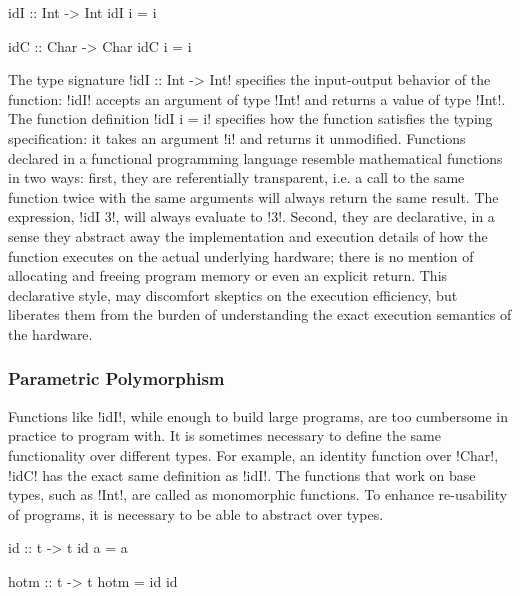 \documentclass[screen,nonacm]{acmart}
\begin{document}
\begin{minipage}{0.5\linewidth}
\begin{CenteredBox}
\begin{code}
idI :: Int -> Int
idI i = i
\end{code}
\end{CenteredBox}
\end{minipage}%
\begin{minipage}{0.5\linewidth}
\begin{CenteredBox}
\begin{code}
idC :: Char -> Char
idC i = i
\end{code}
\end{CenteredBox}
\end{minipage}

The type signature !idI :: Int -> Int! specifies the input-output behavior of the
function: !idI! accepts an argument of type !Int! and returns a value of type !Int!. The
function definition !idI i = i! specifies how the function satisfies the typing
specification: it takes an argument !i! and returns it unmodified. Functions declared in a
functional programming language resemble mathematical functions in two ways: first, they
are referentially transparent, i.e. a call to the same function twice with the same
arguments will always return the same result. The expression, !idI 3!, will always
evaluate to !3!. Second, they are declarative, in a sense they abstract away the
implementation and execution details of how the function executes on the actual underlying
hardware; there is no mention of allocating and freeing program memory or even an explicit
return. This declarative style, may discomfort skeptics on the execution efficiency, but
liberates them from the burden of understanding the exact execution semantics of the
hardware.

\subsubsection{Parametric Polymorphism}
Functions like !idI!, while enough to build large programs, are too cumbersome in
practice to program with. It is sometimes necessary to define the same functionality over
different types. For example, an identity function over !Char!, !idC! has the exact same
definition as !idI!. The functions that work on base types, such as !Int!, are called as
monomorphic functions. To enhance re-usability of programs, it is necessary to be able to
abstract over types.


\begin{minipage}{0.5\linewidth}
\begin{CenteredBox}
\begin{code}
id :: t -> t
id a = a
\end{code}
\end{CenteredBox}
\end{minipage}%
\begin{minipage}[ht]{0.5\linewidth}
\begin{CenteredBox}
\begin{code}
hotm :: t -> t
hotm = id id
\end{code}
\end{CenteredBox}
\end{minipage}
\end{document}
